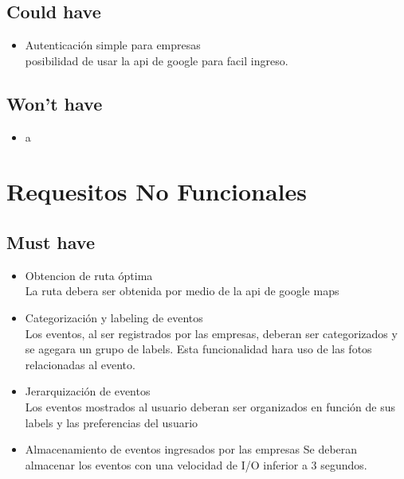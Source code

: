 \documentclass[a4paper,12pt,oneside]{article}
\begin{document}
\subsection{Could have}
  \begin{itemize}
    \item Autenticación simple para empresas \\
      posibilidad de usar la api de google para facil ingreso.
  \end{itemize}

\subsection{Won't have}
  \begin{itemize}
    \item a \\
  \end{itemize}

\section{Requesitos No Funcionales}

\subsection{Must have}
  \begin{itemize}
    \item Obtencion de ruta óptima \\
      La ruta debera ser obtenida por medio de la api de google maps
    \item Categorización y labeling de eventos \\
      Los eventos, al ser registrados por las empresas, deberan ser categorizados y se agegara un grupo de labels. Esta funcionalidad hara uso de las fotos relacionadas al evento.
    \item Jerarquización de eventos \\
      Los eventos mostrados al usuario deberan ser organizados en función de sus labels y las preferencias del usuario
    \item Almacenamiento de eventos ingresados por las empresas
      Se deberan almacenar los eventos con una velocidad de I/O inferior a 3 segundos.
  \end{itemize}
\end{document}
